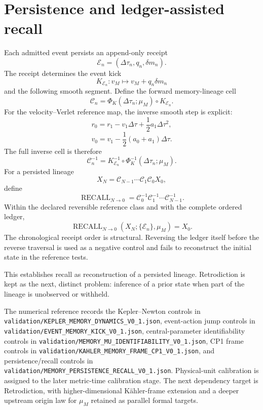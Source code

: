 \documentclass[11pt]{book}
\begin{document}
\section{Persistence and ledger-assisted recall}

Each admitted event persists an append-only receipt
\[
\boxed{
\mathcal E_n=(\Delta\tau_n,q_n,\delta m_n).
}
\]
The receipt determines the event kick
\[
K_{\mathcal E_n}:v_M\mapsto v_M+q_n\delta m_n
\]
and the following smooth segment. Define the forward memory-lineage cell
\[
\boxed{
\mathcal C_n
=\Phi_K(\Delta\tau_n;\mu_M)\circ K_{\mathcal E_n}.
}
\]
For the velocity--Verlet reference map, the inverse smooth step is explicit:
\[
\boxed{
r_0=r_1-v_1\Delta\tau+\frac12a_1\Delta\tau^2,
}
\]
\[
\boxed{
v_0=v_1-\frac12(a_0+a_1)\Delta\tau.
}
\]
The full inverse cell is therefore
\[
\boxed{
\mathcal C_n^{-1}
=K_{\mathcal E_n}^{-1}\circ\Phi_K^{-1}(\Delta\tau_n;\mu_M).
}
\]
For a persisted lineage
\[
X_N=\mathcal C_{N-1}\cdots\mathcal C_1\mathcal C_0X_0,
\]
define
\[
\boxed{
\operatorname{RECALL}_{N\to0}
=\mathcal C_0^{-1}\mathcal C_1^{-1}\cdots\mathcal C_{N-1}^{-1}.
}
\]
Within the declared reversible reference class and with the complete ordered ledger,
\[
\boxed{
\operatorname{RECALL}_{N\to0}(X_N;\{\mathcal E_n\},\mu_M)=X_0.
}
\]
The chronological receipt order is structural. Reversing the ledger itself before the reverse traversal is used as a negative control and fails to reconstruct the initial state in the reference tests.

This establishes recall as reconstruction of a persisted lineage. Retrodiction is kept as the next, distinct problem: inference of a prior state when part of the lineage is unobserved or withheld.

The numerical reference records the Kepler--Newton controls in \texttt{validation/KEPLER\_MEMORY\_DYNAMICS\_V0\_1.json}, event-action jump controls in \texttt{validation/EVENT\_MEMORY\_KICK\_V0\_1.json}, central-parameter identifiability controls in \texttt{validation/MEMORY\_MU\_IDENTIFIABILITY\_V0\_1.json}, CP1 frame controls in \texttt{validation/KAHLER\_MEMORY\_FRAME\_CP1\_V0\_1.json}, and persistence/recall controls in \texttt{validation/MEMORY\_PERSISTENCE\_RECALL\_V0\_1.json}. Physical-unit calibration is assigned to the later metric-time calibration stage. The next dependency target is Retrodiction, with higher-dimensional K\"ahler-frame extension and a deeper upstream origin law for \(\mu_M\) retained as parallel formal targets.

\end{document}
